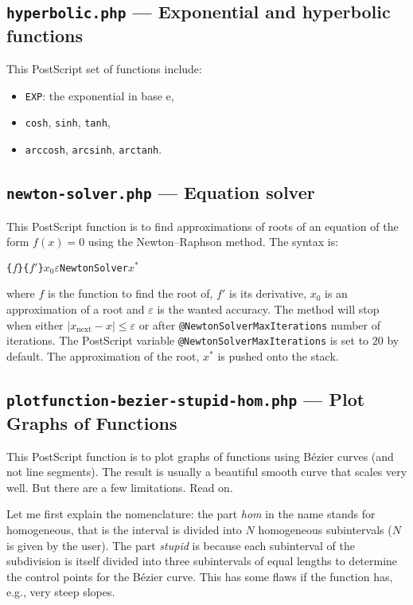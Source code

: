 \documentclass[10pt,a4paper]{scrartcl}
\newcommand\code[1]{\lstinline{#1}}
\newcommand\PS{PostScript}
\begin{document}
\subsection{\texttt{hyperbolic.php} --- Exponential and hyperbolic functions }
This \PS{} set of functions include:
\begin{itemize}
\item \code{EXP}: the exponential in base $\mathrm{e}$,
\item \code{cosh}, \code{sinh}, \code{tanh},
\item \code{arccosh}, \code{arcsinh}, \code{arctanh}.
\end{itemize}

\subsection{\texttt{newton-solver.php} --- Equation solver}
\label{ssec:newton-solver.php}
This \PS{} function is to find approximations of roots of an equation
of the form $f(x)=0$ using the Newton--Raphson method. The syntax is:
\begin{center}
\texttt{\{}$f$\texttt{\}}\quad\texttt{\{}$f'$\texttt{\}}\quad$x_0$\quad$\varepsilon$\quad\texttt{NewtonSolver}\quad$x^*$
\end{center}
where $f$ is the function to find the root of, $f'$ is its derivative, $x_0$ is an approximation of a root
and $\varepsilon$ is the wanted accuracy. The method will stop when either $\lvert x_{\text{next}}-x\rvert\leq\varepsilon$
or after \verb=@NewtonSolverMaxIterations= number of iterations. The \PS{} variable \verb=@NewtonSolverMaxIterations=
is set to $20$ by default. The approximation of the root, $x^*$ is pushed onto the stack.

\subsection{\texttt{plotfunction-bezier-stupid-hom.php} --- Plot Graphs of Functions}
\label{ssec:plotfunction-bezier-stupid-hom.php}
This \PS{} function is to plot graphs of functions using B\'ezier curves (and not
line segments). The result is usually a beautiful smooth curve that scales very
well. But there are a few limitations. Read on.

Let me first explain the nomenclature: the part \emph{hom} in the name stands
for homogeneous, that is the interval is divided into $N$ homogeneous
subintervals ($N$ is given by the user). The part \emph{stupid} is because each subinterval
of the subdivision is itself divided into three subintervals of equal lengths to determine
the control points for the B\'ezier curve. This has some flaws if the function has, e.g.,
very steep slopes.
\end{document}
